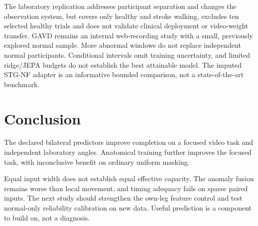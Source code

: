 \documentclass[letterpaper]{article}
\begin{document}
The laboratory replication addresses participant separation and changes the observation system, but covers only healthy and stroke walking, excludes ten selected healthy trials and does not validate clinical deployment or video-weight transfer. GAVD remains an internal web-recording study with a small, previously explored normal sample. More abnormal windows do not replace independent normal participants. Conditional intervals omit training uncertainty, and limited ridge/JEPA budgets do not establish the best attainable model. The imputed STG-NF adapter is an informative bounded comparison, not a state-of-the-art benchmark.

\section{Conclusion}

The declared bilateral predictors improve completion on a focused video task and independent laboratory angles. Anatomical training further improves the focused task, with inconclusive benefit on ordinary uniform masking.

Equal input width does not establish equal effective capacity. The anomaly fusion remains worse than local movement, and timing adequacy fails on sparse paired inputs. The next study should strengthen the own-leg feature control and test normal-only reliability calibration on new data. Useful prediction is a component to build on, not a diagnosis.

\end{document}
